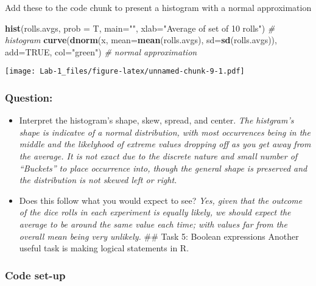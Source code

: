 \documentclass[
]{article}
\newenvironment{Shaded}{\begin{snugshade}}{\end{snugshade}}
\newcommand{\CommentTok}[1]{\textcolor[rgb]{0.56,0.35,0.01}{\textit{#1}}}
\newcommand{\DataTypeTok}[1]{\textcolor[rgb]{0.13,0.29,0.53}{#1}}
\newcommand{\KeywordTok}[1]{\textcolor[rgb]{0.13,0.29,0.53}{\textbf{#1}}}
\newcommand{\NormalTok}[1]{#1}
\newcommand{\OtherTok}[1]{\textcolor[rgb]{0.56,0.35,0.01}{#1}}
\newcommand{\StringTok}[1]{\textcolor[rgb]{0.31,0.60,0.02}{#1}}
\providecommand{\tightlist}{%
  \setlength{\itemsep}{0pt}\setlength{\parskip}{0pt}}
\begin{document}
Add these to the code chunk to present a histogram with a normal
approximation

\begin{Shaded}
\begin{Highlighting}[]
\KeywordTok{hist}\NormalTok{(rolls.avgs, }\DataTypeTok{prob =}\NormalTok{ T, }\DataTypeTok{main=}\StringTok{""}\NormalTok{, }\DataTypeTok{xlab=}\StringTok{"Average of set of 10 rolls"}\NormalTok{) }\CommentTok{# histogram}
\KeywordTok{curve}\NormalTok{(}\KeywordTok{dnorm}\NormalTok{(x, }\DataTypeTok{mean=}\KeywordTok{mean}\NormalTok{(rolls.avgs), }\DataTypeTok{sd=}\KeywordTok{sd}\NormalTok{(rolls.avgs)), }\DataTypeTok{add=}\OtherTok{TRUE}\NormalTok{, }\DataTypeTok{col=}\StringTok{"green"}\NormalTok{) }\CommentTok{# normal approximation}
\end{Highlighting}
\end{Shaded}

\texttt{[image: Lab-1\_files/figure-latex/unnamed-chunk-9-1.pdf]}

\hypertarget{question-2}{%
\subsubsection{Question:}\label{question-2}}

\begin{itemize}
\tightlist
\item
  Interpret the histogram's shape, skew, spread, and center. \emph{The
  histgram's shape is indicatve of a normal distribution, with most
  occurrences being in the middle and the likelyhood of extreme values
  dropping off as you get away from the average. It is not exact due to
  the discrete nature and small number of ``Buckets'' to place
  occurrence into, though the general shape is preserved and the
  distribution is not skewed left or right.}
\item
  Does this follow what you would expect to see? \emph{Yes, given that
  the outcome of the dice rolls in each experiment is equally likely, we
  should expect the average to be around the same value each time; with
  values far from the overall mean being very unlikely.} \#\# Task 5:
  Boolean expressions Another useful task is making logical statements
  in R.
\end{itemize}

\hypertarget{code-set-up-3}{%
\subsubsection{Code set-up}\label{code-set-up-3}}
\end{document}
